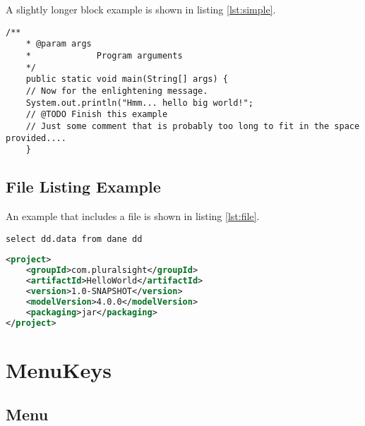 	A slightly longer block example is shown in listing \ref{lst:simple}.
	
	\begin{lstlisting}[caption={A simple listing.}, label={lst:simple}]
	/**
	* @param args
	*             Program arguments
	*/
	public static void main(String[] args) {
	// Now for the enlightening message.
	System.out.println("Hmm... hello big world!";
	// @TODO Finish this example
	// Just some comment that is probably too long to fit in the space provided....
	}
	\end{lstlisting}
	
	\subsection*{File Listing Example}
	
	An example that includes a  file is shown in listing \ref{lst:file}.
	
	
	
	
	
	
	
	
	
\begin{lstlisting}[caption={Some Java code},label={lst:label},style=terminal]
select dd.data from dane dd 
\end{lstlisting}
		
\begin{lstlisting}[caption={A simple listing.}, label={lst:simple}, language=XML]
<project>
	<groupId>com.pluralsight</groupId>
	<artifactId>HelloWorld</artifactId>
	<version>1.0-SNAPSHOT</version>
	<modelVersion>4.0.0</modelVersion>
	<packaging>jar</packaging>
</project>
	\end{lstlisting}
\section{MenuKeys}

	\subsection{Menu}

